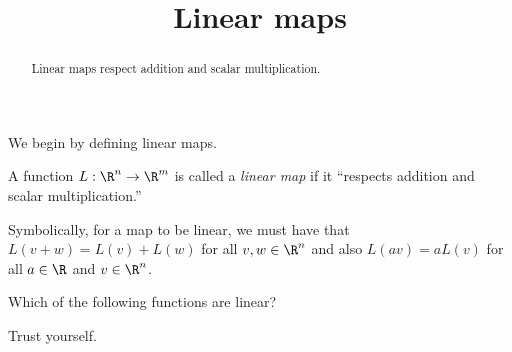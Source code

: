 \documentclass{ximera}
\title{Linear maps}
\begin{document}
\begin{abstract}
  Linear maps respect addition and scalar multiplication.
\end{abstract}

We begin by defining linear maps.

\begin{definition}
  A function $L: \R^n \to \R^m$ is called a \textit{linear map} if it
  ``respects addition and scalar multiplication.''

  Symbolically, for a map to be linear, we must have that $L(v+w) =
  L(v)+L(w)$ for all $v,w \in \R^n$ and also $L(av) = a L(v)$ for all
  $a \in \R$ and $v\in \R^n$.
\end{definition}

\begin{question}
  Which of the following functions are linear?
  \begin{solution}
    \begin{hint}
      Trust yourself.
    \end{hint}
	

\end{solution}
\end{question}
\end{document}
